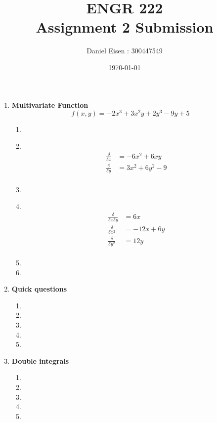 \documentclass[11pt]{article}
\title{ENGR 222 \\ Assignment 2 Submission}
\author{Daniel Eisen : 300447549}
\date{\today}
\newcommand\Item[1][]{%
  \ifx\relax#1\relax  \item \else \item[#1] \fi
  \abovedisplayskip=0pt\abovedisplayshortskip=0pt~\vspace*{-\baselineskip}}
\begin{document}
\maketitle
\begin{enumerate}
    \item \textbf{Multivariate Function}
          $$f(x,y) = -2x^{3} + 3x^{2}y + 2y^{3} - 9y + 5$$
          \begin{enumerate}
              \Item
              \begin{align*}
                  \frac{\delta}{\delta x} & = -6x^{2} + 6xy       \\
                  \frac{\delta}{\delta y} & = 3x^{2} + 6y^{2} - 9 \\
              \end{align*}
              \Item
              \begin{align*}
                \frac{\delta}{\delta x \delta y} & = 6x \\
                \frac{\delta}{\delta x^{2}} & = -12x + 6y \\
                \frac{\delta}{\delta y^{2}} & = 12y       \\
              \end{align*}
              \item
              \item
          \end{enumerate}
    \item \textbf{Quick questions}
          \begin{enumerate}
              \item 
              \item
              \item
              \item
              \item
          \end{enumerate}
    \item \textbf{Double integrals}
          \begin{enumerate}
              \item
              \item
              \item
              \item
              \item

\end{enumerate}
\end{enumerate}
\end{document}
